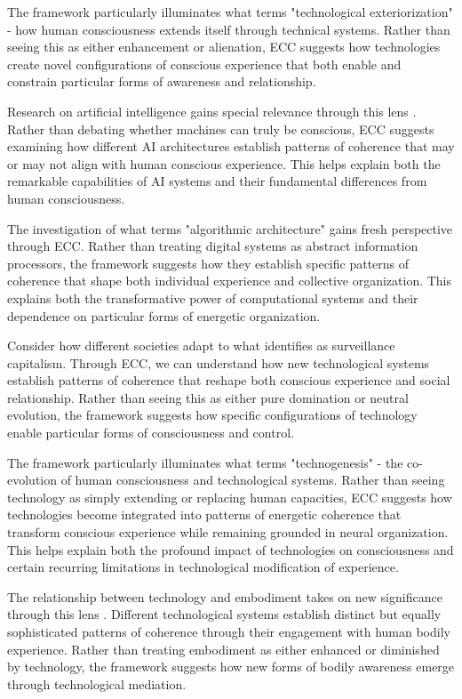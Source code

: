 The framework particularly illuminates what \cite{stiegler2010taking} terms "technological exteriorization" - how human consciousness extends itself through technical systems. Rather than seeing this as either enhancement or alienation, ECC suggests how technologies create novel configurations of conscious experience that both enable and constrain particular forms of awareness and relationship.

Research on artificial intelligence gains special relevance through this lens \cite{clark2003natural}. Rather than debating whether machines can truly be conscious, ECC suggests examining how different AI architectures establish patterns of coherence that may or may not align with human conscious experience. This helps explain both the remarkable capabilities of AI systems and their fundamental differences from human consciousness.

The investigation of what \cite{parisi2013contagious} terms "algorithmic architecture" gains fresh perspective through ECC. Rather than treating digital systems as abstract information processors, the framework suggests how they establish specific patterns of coherence that shape both individual experience and collective organization. This explains both the transformative power of computational systems and their dependence on particular forms of energetic organization.

Consider how different societies adapt to what \cite{zuboff2019age} identifies as surveillance capitalism. Through ECC, we can understand how new technological systems establish patterns of coherence that reshape both conscious experience and social relationship. Rather than seeing this as either pure domination or neutral evolution, the framework suggests how specific configurations of technology enable particular forms of consciousness and control.

The framework particularly illuminates what \cite{hayles2012how} terms "technogenesis" - the co-evolution of human consciousness and technological systems. Rather than seeing technology as simply extending or replacing human capacities, ECC suggests how technologies become integrated into patterns of energetic coherence that transform conscious experience while remaining grounded in neural organization. This helps explain both the profound impact of technologies on consciousness and certain recurring limitations in technological modification of experience.

The relationship between technology and embodiment takes on new significance through this lens \cite{ihde2009postphenomenology}. Different technological systems establish distinct but equally sophisticated patterns of coherence through their engagement with human bodily experience. Rather than treating embodiment as either enhanced or diminished by technology, the framework suggests how new forms of bodily awareness emerge through technological mediation.

